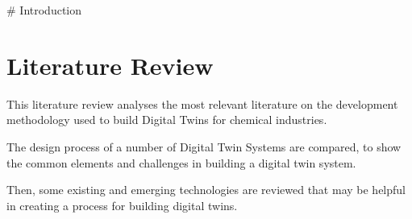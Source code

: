 # Introduction



\section{Literature Review}

This literature review analyses the most relevant literature on the development methodology used to build Digital Twins for chemical industries.

The design process of a number of Digital Twin Systems are compared, to show the common elements and challenges in building a digital twin system.

Then, some existing and emerging technologies are reviewed that may be helpful in creating a process for building digital twins.
